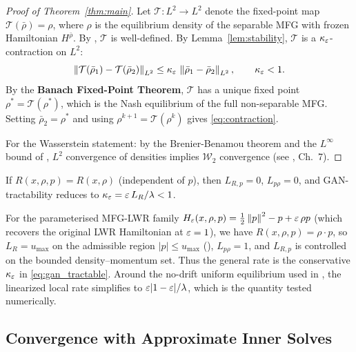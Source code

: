\begin{proof}[Proof of Theorem~\ref{thm:main}]
Let $\mathcal{T}: L^2 \to L^2$ denote the fixed-point map $\mathcal{T}(\bar\rho) = \rho$,
where $\rho$ is the equilibrium density of the separable MFG with
frozen Hamiltonian $H^{\bar\rho}$. By , $\mathcal{T}$ is
well-defined. By Lemma~\ref{lem:stability}, $\mathcal{T}$ is a
$\kappa_\varepsilon$-contraction on $L^2$:
\[
  \left\lVert \mathcal{T}(\bar\rho_1) - \mathcal{T}(\bar\rho_2) \right\rVert_{L^2}
  \leq \kappa_\varepsilon\,\left\lVert \bar\rho_1 - \bar\rho_2 \right\rVert_{L^2}, \qquad \kappa_\varepsilon < 1.
\]
By the \textbf{Banach Fixed-Point Theorem}, $\mathcal{T}$ has a unique fixed
point $\rho^* = \mathcal{T}(\rho^*)$, which is the Nash equilibrium of the
full non-separable MFG. Setting $\bar\rho_2 = \rho^*$ and using
$\rho^{k+1} = \mathcal{T}(\rho^k)$ gives \eqref{eq:contraction}.

For the Wasserstein statement: by the Brenier-Benamou theorem and
the $L^\infty$ bound of , $L^2$ convergence of densities
implies $\mathcal{W}_2$ convergence (see \citet{villani2009optimal}, Ch.~7).
\end{proof}

\begin{corollary}\label{cor:density}
If $R(x,\rho,p) = R(x,\rho)$ (independent of $p$), then $L_{R,p} = 0$,
\(L_{p\rho}=0\), and GAN-tractability reduces to
$\kappa_\varepsilon=\varepsilon\, L_R/\lambda<1$.
\end{corollary}

\begin{corollary}\label{cor:bilinear}
For the parameterised MFG-LWR family
$H_\varepsilon(x,\rho,p) = \tfrac{1}{2}\left\lVert p \right\rVert^2 - p + \varepsilon\,\rho p$ (which
recovers the original LWR Hamiltonian at $\varepsilon = 1$), we have
$R(x,\rho,p) = \rho\cdot p$, so $L_R = u_{\max}$ on the admissible region
$|p| \leq u_{\max}$ (), \(L_{p\rho}=1\), and
\(L_{R,p}\) is controlled on the bounded density--momentum set.  Thus the
general rate is the conservative \(\kappa_\varepsilon\) in
\eqref{eq:gan_tractable}.  Around the no-drift uniform equilibrium used in
, the linearized local rate simplifies to
\(\varepsilon |1-\varepsilon|/\lambda\), which is the quantity tested numerically.
\end{corollary}

\subsection{Convergence with Approximate Inner Solves}

